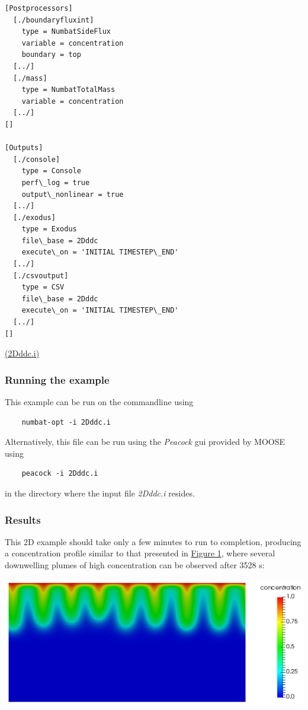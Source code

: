 \documentclass[12pt]{article}
\begin{document}
\begin{lstlisting}
[Postprocessors]
  [./boundaryfluxint]
    type = NumbatSideFlux
    variable = concentration
    boundary = top
  [../]
  [./mass]
    type = NumbatTotalMass
    variable = concentration
  [../]
[]

[Outputs]
  [./console]
    type = Console
    perf\_log = true
    output\_nonlinear = true
  [../]
  [./exodus]
    type = Exodus
    file\_base = 2Dddc
    execute\_on = 'INITIAL TIMESTEP\_END'
  [../]
  [./csvoutput]
    type = CSV
    file\_base = 2Dddc
    execute\_on = 'INITIAL TIMESTEP\_END'
  [../]
[]
\end{lstlisting}\href{https://github.com/idaholab/moose/blob/master/examples/2D/isotropic/2Dddc.i}{(2Dddc.i)}\subsubsection{Running the example\label{running-the-example}}
\par
This example can be run on the commandline using\begin{lstlisting}
    numbat-opt -i 2Dddc.i
\end{lstlisting}
\par
Alternatively, this file can be run using the \emph{Peacock} gui provided by
MOOSE using\begin{lstlisting}
    peacock -i 2Dddc.i
\end{lstlisting}
\par
in the directory where the input file \emph{2Dddc.i} resides.\subsubsection{Results\label{results}}
\par
This 2D example should take only a few minutes to run to completion,
producing a concentration profile similar to that presented in \href{#Figure}{Figure 1},
where several downwelling plumes of high concentration can be observed after 3528 s:
\par
\includegraphics[width=\linewidth]{media/2D.png}
\end{document}
